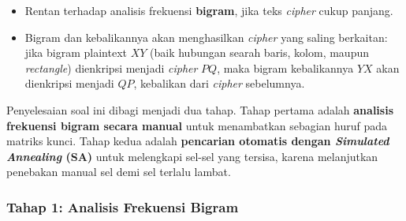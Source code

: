 \begin{itemize}
  \item Rentan terhadap analisis frekuensi \textbf{bigram}, jika teks \textit{cipher} cukup panjang.
  \item Bigram dan kebalikannya akan menghasilkan \textit{cipher} yang saling berkaitan: jika bigram
  plaintext $XY$ (baik hubungan searah baris, kolom, maupun \textit{rectangle}) dienkripsi menjadi
  \textit{cipher} $PQ$, maka bigram kebalikannya $YX$ akan dienkripsi menjadi $QP$, kebalikan dari
  \textit{cipher} sebelumnya.
\end{itemize}

Penyelesaian soal ini dibagi menjadi dua tahap. Tahap pertama adalah \textbf{analisis frekuensi bigram
secara manual} untuk menambatkan sebagian huruf pada matriks kunci. Tahap kedua adalah \textbf{pencarian
otomatis dengan \textit{Simulated Annealing} (SA)} untuk melengkapi sel-sel yang tersisa, karena
melanjutkan penebakan manual sel demi sel terlalu lambat.

\subsubsection*{Tahap 1: Analisis Frekuensi Bigram}

